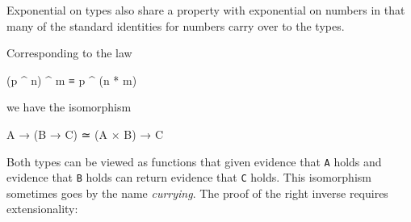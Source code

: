 Exponential on types also share a property with exponential on numbers
in that many of the standard identities for numbers carry over to the
types.

Corresponding to the law

\begin{myDisplay}
(p ^ n) ^ m  ≡  p ^ (n * m)
\end{myDisplay}

we have the isomorphism

\begin{myDisplay}
A → (B → C)  ≃  (A × B) → C
\end{myDisplay}

Both types can be viewed as functions that given evidence that
\texttt{A} holds and evidence that \texttt{B} holds can return evidence
that \texttt{C} holds. This isomorphism sometimes goes by the name
\emph{currying}. The proof of the right inverse requires extensionality:

